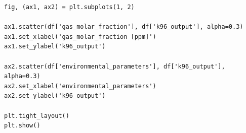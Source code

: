 \begin{lstlisting}[caption=Correlation scatter plots., label=lst:scatter]
fig, (ax1, ax2) = plt.subplots(1, 2)

ax1.scatter(df['gas_molar_fraction'], df['k96_output'], alpha=0.3)
ax1.set_xlabel('gas_molar_fraction [ppm]')
ax1.set_ylabel('k96_output')

ax2.scatter(df['environmental_parameters'], df['k96_output'], alpha=0.3)
ax2.set_xlabel('environmental_parameters')
ax2.set_ylabel('k96_output')

plt.tight_layout()
plt.show()
\end{lstlisting}